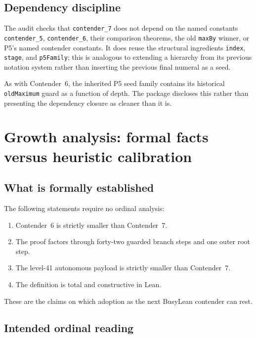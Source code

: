 \documentclass[11pt]{article}
\theoremstyle{definition}
\theoremstyle{remark}
\newcommand{\lean}[1]{\texttt{#1}}
\begin{document}
\subsection{Dependency discipline}

The audit checks that \lean{contender\_7} does not depend on the named constants
\lean{contender\_5}, \lean{contender\_6}, their comparison theorems, the old
\lean{maxBy} winner, or P5's named contender constants.  It does reuse the
structural ingredients \lean{index}, \lean{stage}, and \lean{p5Family}; this is
analogous to extending a hierarchy from its previous notation system rather
than inserting the previous final numeral as a seed.

As with Contender~6, the inherited P5 seed family contains its historical
\lean{oldMaximum} guard as a function of depth.  The package discloses this
rather than presenting the dependency closure as cleaner than it is.

\section{Growth analysis: formal facts versus heuristic calibration}

\subsection{What is formally established}

The following statements require no ordinal analysis:

\begin{enumerate}[leftmargin=*]
\item Contender~6 is strictly smaller than Contender~7.
\item The proof factors through forty-two guarded branch steps and one outer
  root step.
\item The level-41 autonomous payload is strictly smaller than Contender~7.
\item The definition is total and constructive in Lean.
\end{enumerate}

These are the claims on which adoption as the next BusyLean contender can rest.

\subsection{Intended ordinal reading}
\end{document}
